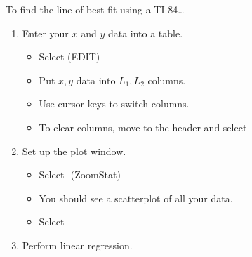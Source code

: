 \begin{center}
\begin{minipage}[t]{0.75\textwidth}
\begin{myConcept}{To find the line of best fit using a {\scshape TI-84}\dots}
\begin{enumerate}
\begin{itemize}
                    \item Make sure that {\ttfamily XList} is $\text{\ttfamily L}_1$.
                    \item Make sure that {\ttfamily YList} is $\text{\ttfamily L}_2$.
                    \item Select 
                \end{itemize}
            \item Enter your $x$ and $y$ data into a table.
                \begin{itemize}
                    \item Select 
                         {\footnotesize\ttfamily (EDIT)}
                    \item Put $x, y$ data into $L_1, L_2$ columns.
                    \item Use cursor keys to switch columns.
                    \item To clear columns, move to the header and select 
                \end{itemize}
            \item Set up the plot window.
                \begin{itemize}
                    \item Select 
                        \,\,{\footnotesize\ttfamily (ZoomStat)}
                    \item You should see a scatterplot of all your data.
                    \item Select 
                \end{itemize}
            \item Perform linear regression.
                \begin{itemize}

\end{itemize}
\end{enumerate}
\end{myConcept}
\end{minipage}
\end{center}
